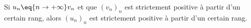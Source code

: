 Si $u_n \eq{n\to+\infty} v_n$ et que $(v_n)_n$ est strictement positive à partir d'un certain rang, alors $(u_n)_n$ est strictement positive à partir d'un certain rang.

\begin{reponses}
\end{reponses}

